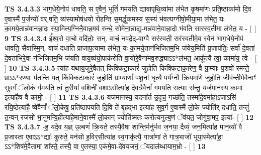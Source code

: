 \documentclass[17pt]{extarticle}
\begin{document}
                  \newline
                                \textbf{ TS 3.4.3.3} \newline
                  भाग॒धेये॒नोप॑ धावति॒ स ए॒वैनं॒ भूतिं॑ गमयति द्यावापृथि॒व्या॑मा ल॑भेत कृ॒षमा॑णः प्रति॒ष्ठाका॑मो दि॒व ए॒वास्मै॑ प॒र्जन्यो॑ वर्.षति॒ व्य॑स्यामोष॑धयो रोहन्ति स॒मर्द्धु॑कमस्य स॒स्यं भ॑वत्यग्नीषो॒मीया॒मा ल॑भेत॒ यः का॒मये॒तान्न॑वानन्ना॒दः स्या॒मित्य॒ग्निनै॒वान्न॒मव॑ रुन्धे॒ सोमे॑ना॒न्नाद्य॒-मन्न॑वाने॒वान्ना॒दो भ॑वति सारस्व॒तीमा ल॑भेत॒ य - [  ] \textbf{  9} \newline
                  \newline
                                \textbf{ TS 3.4.3.4} \newline
                  ई᳚श्व॒रो वा॒चो वदि॑तोः॒ सन्. वाचं॒ नवदे॒द्-वाग्वै सर॑स्वती॒ सर॑स्वतीमे॒व स्वेन॑ भाग॒धेये॒नोप॑ धावति॒ सैवास्मि॒न्. वाचं॑ दधाति प्राजाप॒त्यामा ल॑भेत॒ यः का॒मये॒तान॑भिजितम॒भि ज॑येय॒मिति॑ प्र॒जाप॑तिः॒ सर्वा॑ दे॒वता॑ दे॒वता॑भिरे॒वा-न॑भिजितम॒भि ज॑यति वाय॒व्य॑यो॒पाक॑रोति वा॒योरे॒वैना॑मव॒रुद्ध्याऽऽ*ल॑भत॒ आकू᳚त्यै त्वा॒ कामा॑य॒ त्वे - [  ] \textbf{  10} \newline
                  \newline
                                \textbf{ TS 3.4.3.5} \newline
                  त्या॑ह यथाय॒जुरे॒वैतत् कि॑क्किटा॒कारं॑ जुहोति किक्किटाका॒रेण॒ वै ग्रा॒म्याः प॒शवो॑ रमन्ते॒ प्राऽऽ*र॒ण्याः प॑तन्ति॒ यत् कि॑क्किटा॒कारं॑ जु॒होति॑ ग्रा॒म्याणां᳚ पशू॒नां धृत्यै॒ पर्य॑ग्नौ क्रि॒यमा॑णे जुहोति॒ जीव॑न्तीमे॒वैनाꣳ॑ सुव॒र्गं ॅलो॒कं ग॑मयति॒ त्वं तु॒रीया॑ व॒शिनी॑ व॒शाऽसीत्या॑ह देव॒त्रैवैनां᳚ गमयति स॒त्याः स॑न्तु॒ यज॑मानस्य॒ कामा॒ इत्या॑है॒ष वै कामो॒ -  [  ] \textbf{  11} \newline
                  \newline
                                \textbf{ TS 3.4.3.6} \newline
                  यज॑मानस्य॒ यदना᳚र्त उ॒दृचं॒ गच्छ॑ति॒ तस्मा॑दे॒वमा॑हा॒ऽजाऽसि॑ रयि॒ष्ठेत्या॑है॒ ष्वे॑वैनां᳚ ॅलो॒केषु॒ प्रति॑ष्ठापयति दि॒वि ते॑ बृ॒हद्भा इत्या॑ह सुव॒र्ग ए॒वास्मै॑ लो॒के ज्योति॑र् दधाति॒ तन्तुं॑ त॒न्वन् रज॑सो भा॒नुमन्वि॒हीत्या॑हे॒माने॒वास्मै॑ लो॒कान् ज्योति॑ष्मतः करोत्यनुल्ब॒णं ॅव॑यत॒ जोगु॑वा॒मप॒ इत्या॑-  [  ] \textbf{  12} \newline
                  \newline
                                \textbf{ TS 3.4.3.7} \newline
                  -ह॒ यदे॒व य॒ज्ञ् उ॒ल्बणं॑ क्रि॒यते॒ तस्यै॒वैषा शान्ति॒र्मनु॑र्भव ज॒नया॒ दैव्यं॒ जन॒मित्या॑ह मान॒व्यो॑ वै प्र॒जास्ता ए॒वाऽऽ*द्याः᳚ कुरुते॒ मन॑सो ह॒विर॒सीत्या॑ह स्व॒गाकृ॑त्यै॒ गात्रा॑णां ते गात्र॒भाजो॑ भूया॒स्मेत्या॑हा॒ ऽऽ*शिष॑मे॒वैतामा शा᳚स्ते॒ तस्यै॒ वा ए॒तस्या॒ एक॑मे॒वा-दे॑वयजनं॒ ॅयदाल॑ब्धायाम॒भ्रो - [  ] \textbf{  13} \newline
\end{document}
